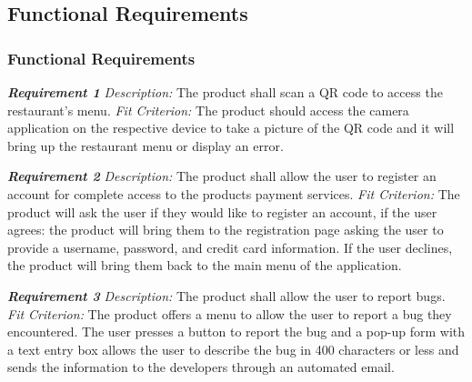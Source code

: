 \documentclass[12pt, titlepage]{article}
\begin{document}
\subsection{Functional Requirements}
\subsubsection{Functional Requirements}

\textbf{\textit{Requirement 1}}\newline
\textit{Description:}\newline
The product shall scan a QR code to access the restaurant's menu.\newline\newline
\textit{Fit Criterion:}\newline 
The product should access the camera application on the respective device to take a picture of the QR code and it will bring up the restaurant menu or display an error.
\newline

\noindent\textbf{\textit{Requirement 2}}\newline
\textit{Description:}\newline
The product shall allow the user to register an account for complete access to the products payment services. \newline\newline
\textit{Fit Criterion:}\newline 
The product will ask the user if they would like to register an account, if the user agrees: the product will bring them to the registration page asking the user to provide a username, password, and credit card information. If the user declines, the product will bring them back to the main menu of the application.
\newline


\noindent\textbf{\textit{Requirement 3}}\newline
\textit{Description:}\newline
The product shall allow the user to report bugs. \newline\newline
\textit{Fit Criterion:}\newline 
The product offers a menu to allow the user to report a bug they encountered. The user presses a button to report the bug and a pop-up form with a text entry box allows the user to describe the bug in 400 characters or less and sends the information to the developers through an automated email.
\newline
\end{document}
